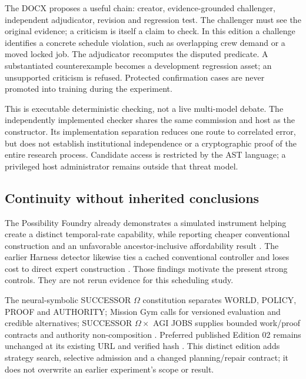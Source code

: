 The DOCX proposes a useful chain: creator, evidence-grounded challenger, independent adjudicator, revision and regression test. The challenger must see the original evidence; a criticism is itself a claim to check. In this edition a challenge identifies a concrete schedule violation, such as overlapping crew demand or a moved locked job. The adjudicator recomputes the disputed predicate. A substantiated counterexample becomes a development regression asset; an unsupported criticism is refused. Protected confirmation cases are never promoted into training during the experiment.

This is executable deterministic checking, not a live multi-model debate. The independently implemented checker shares the same commission and host as the constructor. Its implementation separation reduces one route to correlated error, but does not establish institutional independence or a cryptographic proof of the entire research process. Candidate access is restricted by the AST language; a privileged host administrator remains outside that threat model.

\subsection{Continuity without inherited conclusions}

The Possibility Foundry already demonstrates a simulated instrument helping create a distinct temporal-rate capability, while reporting cheaper conventional construction and an unfavorable ancestor-inclusive affordability result \citep{montreal2026possibility}. The earlier Harness detector likewise ties a cached conventional controller and loses cost to direct expert construction \citep{montreal2026harnessdetector}. Those findings motivate the present strong controls. They are not rerun evidence for this scheduling study.

The neural-symbolic SUCCESSOR $\Omega$ constitution separates WORLD, POLICY, PROOF and AUTHORITY; Mission Gym calls for versioned evaluation and credible alternatives; SUCCESSOR $\Omega\times$ AGI JOBS supplies bounded work/proof contracts and authority non-composition \citep{montreal2026neuralsymbolic,boucher2026missiongym,boucher2026successorjobs}. Preferred published Edition 02 remains unchanged at its existing URL and verified hash \citep{montreal2026flywheeleditiontwo}. This distinct edition adds strategy search, selective admission and a changed planning/repair contract; it does not overwrite an earlier experiment's scope or result.
